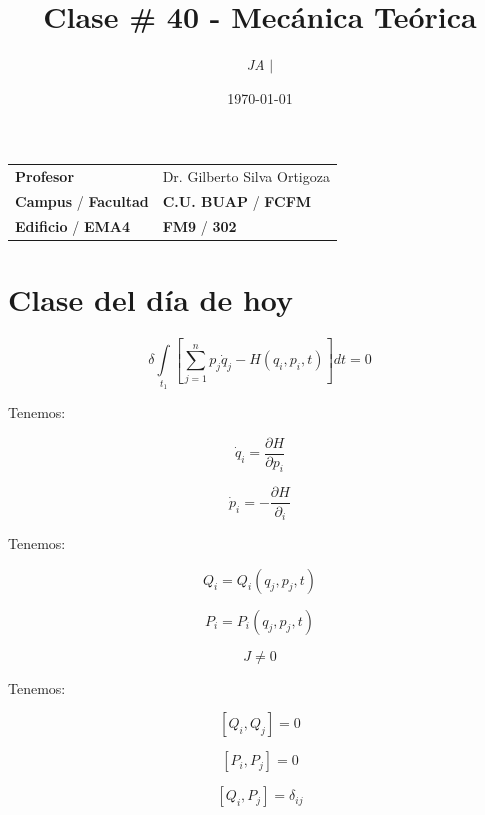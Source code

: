 \documentclass{article}
\title{Clase \# 40 - Mecánica Teórica}
\author{\emph{JA} $\boldsymbol{\mid}$}
\date{\today}
\begin{document}
\maketitle



\begin{mybox}
\noindent\begin{tabular}{@{}ll}
	{\bfseries{Profesor}} & Dr. Gilberto Silva Ortigoza\\
	\textcolor{prussianblue}{\bfseries{Campus}} / \textcolor{trueblue}{\bfseries{Facultad}}  & \textcolor{prussianblue}{\bfseries{C.U. BUAP}} /  \textcolor{trueblue}{\bfseries{FCFM}} \\
	\textcolor{prussianblue}{\bfseries{Edificio}} /  \textcolor{trueblue}{\bfseries{EMA4}}    & 	\textcolor{prussianblue}{\bfseries{FM9}} /  \textcolor{trueblue}{\bfseries{302}}   
\end{tabular} 
\end{mybox} \vspace{1cm}

\tableofcontents

\vspace{2cm}

\section{Clase del día de hoy}


\[ \delta \int\limits_{t_{1}}   \left[  \sum\limits_{j=1}^{n} p_{j}\dot{q}_{j} - H(q_{i},p_{i},t)   \right]dt=0 \]



Tenemos:


\[ \dot{q}_{i} = \frac{ \partial H }{\partial p_{i}} \]


\[ \dot{p}_{i} = - \frac{\partial H}{\partial_{i}}    \]



Tenemos:


\[ Q_{i} = Q_{i}(q_{j},p_{j},t) \]


\[P_{i} = P_{i}(q_{j},p_{j},t)\]


\[ J \neq 0 \]



Tenemos:



\[ \left[ Q_{i},Q_{j}  \right] =0  \]


\[ \left[ P_{i},P_{j}  \right] =0  \]


\[ \left[ Q_{i}, P_{j} \right] = \delta_{ij}   \]
\end{document}
